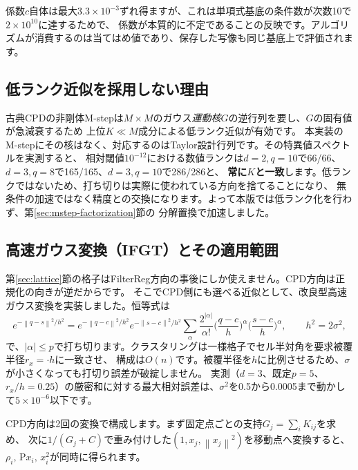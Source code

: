 \documentclass[a4paper,11pt]{article}
\newcommand{\code}[1]{\texttt{\detokenize{#1}}}
\newcommand{\norm}[1]{\left\lVert#1\right\rVert}
\numberwithin{equation}{section}
\begin{document}
係数\(c\)自体は最大\(3.3\times10^{-3}\)ずれ得ますが、これは単項式基底の条件数が次数10で\(2\times10^{10}\)に達するためで、
係数が本質的に不定であることの反映です。アルゴリズムが消費するのは当てはめ値であり、保存した写像も同じ基底上で評価されます。

\subsection{低ランク近似を採用しない理由}\label{sec:lowrank}
古典CPDの非剛体M-stepは\(M\times M\)のガウス\emph{運動核}\(G\)の逆行列を要し、\(G\)の固有値が急減衰するため
上位\(K\ll M\)成分による低ランク近似が有効です。\cite{fastcpd}
本実装のM-stepにその核はなく、対応するのはTaylor設計行列です。その特異値スペクトルを実測すると、
相対閾値\(10^{-12}\)における数値ランクは\(d=2,q=10\)で66/66、\(d=3,q=8\)で165/165、\(d=3,q=10\)で286/286と、
\textbf{常に\(K\)と一致}します。低ランクではないため、打ち切りは実際に使われている方向を捨てることになり、
無条件の加速ではなく精度との交換になります。よって本版では低ランク化を行わず、第\ref{sec:mstep-factorization}節の
分解置換で加速しました。

\subsection{高速ガウス変換（IFGT）とその適用範囲}\label{sec:fgt}
第\ref{sec:lattice}節の格子はFilterReg方向の事後にしか使えません。CPD方向は正規化の向きが逆だからです。
そこでCPD側にも選べる近似として、改良型高速ガウス変換を実装しました。恒等式は
\begin{equation}
 e^{-\norm{q-s}^2/h^2}
 =e^{-\norm{q-c}^2/h^2}e^{-\norm{s-c}^2/h^2}
 \sum_{\alpha}\frac{2^{|\alpha|}}{\alpha!}\Big(\frac{q-c}{h}\Big)^{\alpha}\Big(\frac{s-c}{h}\Big)^{\alpha},
 \qquad h^2=2\sigma^2,
\end{equation}
で、\(|\alpha|\leq p\)で打ち切ります。クラスタリングは一様格子でセル半対角を要求被覆半径\(r_x=\)\code{cluster\_radius}\(\cdot h\)に一致させ、
構成は\(O(n)\)です。被覆半径を\(h\)に比例させるため、\(\sigma\)が小さくなっても打切り誤差が破綻しません。
実測（\(d=3\)、既定\(p=5\)、\(r_x/h=0.25\)）の厳密和に対する最大相対誤差は、\(\sigma^2\)を0.5から0.0005まで動かして\(5\times10^{-6}\)以下です。

CPD方向は2回の変換で構成します。まず固定点ごとの支持\(G_j=\sum_i K_{ij}\)を求め、
次に\(1/(G_j+C)\)で重み付けした\((1,x_j,\norm{x_j}^2)\)を移動点へ変換すると、\(\rho_i,\,\mathrm{P}x_i,\,x^2_i\)が同時に得られます。
\end{document}
